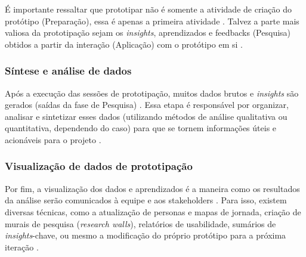 É importante ressaltar que prototipar não é somente a atividade de criação do protótipo (Preparação), essa é apenas a primeira atividade \cite{Stickdorn2019}. Talvez a parte mais valiosa da prototipação sejam os \textit{insights}, aprendizados e feedbacks (Pesquisa) obtidos a partir da interação (Aplicação) com o protótipo em si \cite{paust2025integrative}.

\subsubsection{Síntese e análise de dados}

Após a execução das sessões de prototipação, muitos dados brutos e \textit{insights} são gerados (saídas da fase de Pesquisa) \cite{soto2023prototyping}. Essa etapa é responsável por organizar, analisar e sintetizar esses dados (utilizando métodos de análise qualitativa ou quantitativa, dependendo do caso) para que se tornem informações úteis e acionáveis para o projeto \cite{milton2021eatingdisorders}.

\subsubsection{Visualização de dados de prototipação}

Por fim, a visualização dos dados e aprendizados é a maneira como os resultados da análise serão comunicados à equipe e aos stakeholders \cite{iriarte2023service}. Para isso, existem diversas técnicas, como a atualização de personas e mapas de jornada, criação de murais de pesquisa (\textit{research walls}), relatórios de usabilidade, sumários de \textit{insights}-chave, ou mesmo a modificação do próprio protótipo para a próxima iteração \cite{Stickdorn2019, milton2021eatingdisorders}.



